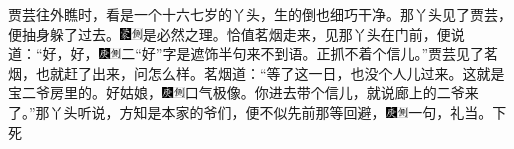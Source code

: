 贾芸往外瞧时，看是一个十六七岁的丫头，生的倒也细巧干净。那丫头见了贾芸，便抽身躲了过去。{\includegraphics[width=3mm]{../Images/00006}\includegraphics[width=3mm]{../Images/00011}\footnotesize \kaishu 是必然之理。}恰值茗烟走来，见那丫头在门前，便说道：``好，好，{\includegraphics[width=3mm]{../Images/00004}\includegraphics[width=3mm]{../Images/00011}\footnotesize \kaishu 二``好''字是遮饰半句来不到语。}正抓不着个信儿。''贾芸见了茗烟，也就赶了出来，问怎么样。茗烟道：``等了这一日，也没个人儿过来。这就是宝二爷房里的。好姑娘，{\includegraphics[width=3mm]{../Images/00004}\includegraphics[width=3mm]{../Images/00011}\footnotesize \kaishu 口气极像。}你进去带个信儿，就说廊上的二爷来了。''那丫头听说，方知是本家的爷们，便不似先前那等回避，{\includegraphics[width=3mm]{../Images/00004}\includegraphics[width=3mm]{../Images/00011}\footnotesize \kaishu 一句，礼当。}下死